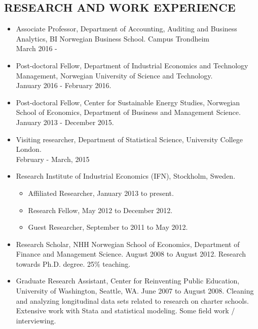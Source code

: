 \documentclass[margin]{res}
\begin{document}
\begin{resume}
\section{RESEARCH AND WORK EXPERIENCE}      
                  \begin{itemize}
                  \setlength{\itemsep}{10pt}
                  \item[] Associate Professor, Department of Accounting, Auditing and Business Analytics, BI Norwegian Business School. Campus Trondheim \\ March 2016 - 
                  \item[] Post-doctoral Fellow, Department of Industrial Economics and Technology Management, Norwegian University of Science and Technology. \\ January 2016 - February 2016. 
                  \item[] Post-doctoral Fellow, Center for Sustainable Energy Studies, Norwegian School of Economics, Department of Business and Management Science. \\ January 2013 - December 2015.

                  \item[] Visiting researcher, Department of Statistical Science, University College London. \\ February - March, 2015
                  
                  \item[] Research Institute of Industrial Economics (IFN), Stockholm, Sweden.
                    \begin{itemize} 
                    \item[] Affiliated Researcher, January 2013 to present.
                    \item[] Research Fellow, May 2012 to December 2012.
                    \item[] Guest Researcher, September to 2011 to May 2012.
                    \end{itemize}
                  \item[] Research Scholar, NHH Norwegian School of Economics, Department of Finance and Management Science. August 2008 to August 2012.  
                  Research towards Ph.D. degree.  25\% teaching.
                  
                  \item[] Graduate Research Assistant, Center for Reinventing Public Education, University of Washington, Seattle, WA. June 2007 to August 2008.  
                  Cleaning and analyzing longitudinal data sets related to research on charter schools.  Extensive work with Stata and statistical modeling.  Some field work / interviewing.
                  

\end{itemize}
\end{resume}
\end{document}
